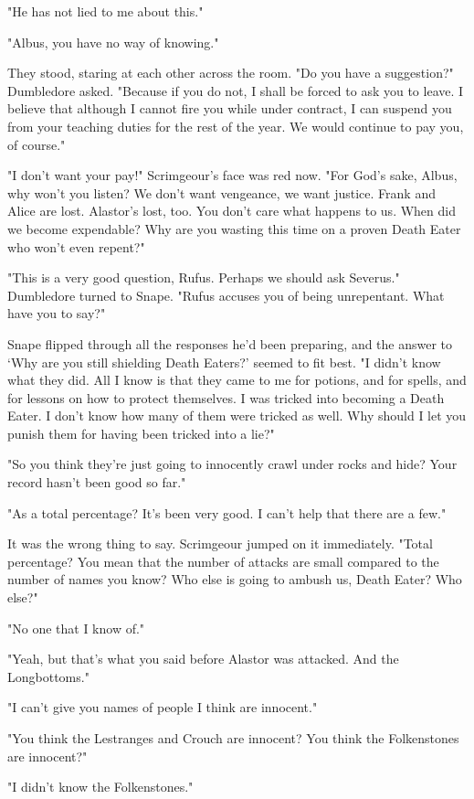 "He has not lied to me about this."

"Albus, you have no way of knowing."

They stood, staring at each other across the room. "Do you have a suggestion?" Dumbledore asked. "Because if you do not, I shall be forced to ask you to leave. I believe that although I cannot fire you while under contract, I can suspend you from your teaching duties for the rest of the year. We would continue to pay you, of course."

"I don't want your pay!" Scrimgeour's face was red now. "For God's sake, Albus, why won't you listen? We don't want vengeance, we want justice. Frank and Alice are lost. Alastor's lost, too. You don't care what happens to us. When did we become expendable? Why are you wasting this time on a proven Death Eater who won't even repent?"

"This is a very good question, Rufus. Perhaps we should ask Severus." Dumbledore turned to Snape. "Rufus accuses you of being unrepentant. What have you to say?"

Snape flipped through all the responses he'd been preparing, and the answer to `Why are you still shielding Death Eaters?' seemed to fit best. "I didn't know what they did. All I know is that they came to me for potions, and for spells, and for lessons on how to protect themselves. I was tricked into becoming a Death Eater. I don't know how many of them were tricked as well. Why should I let you punish them for having been tricked into a lie?"

"So you think they're just going to innocently crawl under rocks and hide? Your record hasn't been good so far."

"As a total percentage? It's been very good. I can't help that there are a few."

It was the wrong thing to say. Scrimgeour jumped on it immediately. "Total percentage? You mean that the number of attacks are small compared to the number of names you know? Who else is going to ambush us, Death Eater? Who else?"

"No one that I know of."

"Yeah, but that's what you said before Alastor was attacked. And the Longbottoms."

"I can't give you names of people I think are innocent."

"You think the Lestranges and Crouch are innocent? You think the Folkenstones are innocent?"

"I didn't know the Folkenstones."

